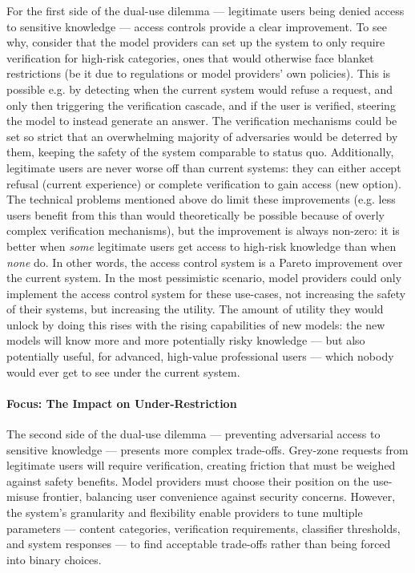 \documentclass{article}
\theoremstyle{plain}
\theoremstyle{definition}
\theoremstyle{remark}
\begin{document}
For the first side of the dual-use dilemma --- legitimate users being denied access to sensitive knowledge --- access controls provide a clear improvement.
To see why, consider that the model providers can set up the system to only require verification for high-risk categories, ones that would otherwise face blanket restrictions (be it due to regulations or model providers' own policies).
This is possible e.g. by detecting when the current system would refuse a request, and only then triggering the verification cascade, and if the user is verified, steering the model to instead generate an answer.
The verification mechanisms could be set so strict that an overwhelming majority of adversaries would be deterred by them, keeping the safety of the system comparable to status quo.
Additionally, legitimate users are never worse off than current systems: they can either accept refusal (current experience) or complete verification to gain access (new option).
The technical problems mentioned above do limit these improvements (e.g. less users benefit from this than would theoretically be possible because of overly complex verification mechanisms), but the improvement is always non-zero: it is better when \emph{some} legitimate users get access to high-risk knowledge than when \emph{none} do.
In other words, the access control system is a Pareto improvement over the current system.
In the most pessimistic scenario, model providers could only implement the access control system for these use-cases, not increasing the safety of their systems, but increasing the utility.
The amount of utility they would unlock by doing this rises with the rising capabilities of new models: the new models will know more and more potentially risky knowledge --- but also potentially useful, for advanced, high-value professional users --- which nobody would ever get to see under the current system.

\paragraph{Focus: The Impact on Under-Restriction}

The second side of the dual-use dilemma --- preventing adversarial access to sensitive knowledge --- presents more complex trade-offs.
Grey-zone requests from legitimate users will require verification, creating friction that must be weighed against safety benefits.
Model providers must choose their position on the use-misuse frontier, balancing user convenience against security concerns.
However, the system's granularity and flexibility enable providers to tune multiple parameters --- content categories, verification requirements, classifier thresholds, and system responses --- to find acceptable trade-offs rather than being forced into binary choices.
\end{document}
